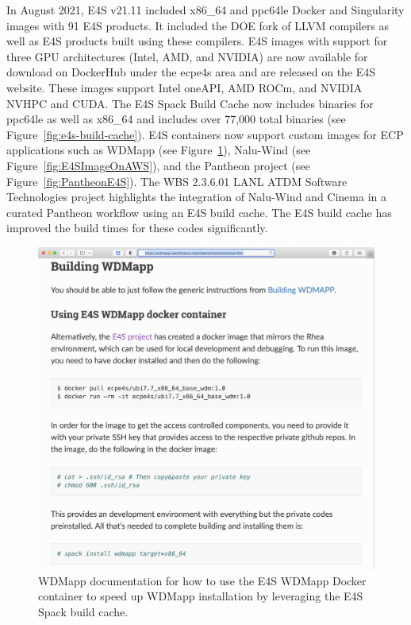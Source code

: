 In August 2021, E4S v21.11 included x86\_64 and ppc64le Docker and Singularity images with 91 E4S products. It included the DOE fork of LLVM compilers as well as E4S products built using these compilers. E4S images with support for three GPU architectures (Intel, AMD, and NVIDIA) are now available for download on DockerHub under the ecpe4s area and are released on the E4S website. These images support Intel oneAPI, AMD ROCm, and NVIDIA NVHPC and CUDA. The E4S Spack Build Cache now includes binaries for ppc64le as well as x86\_64 and includes over 77,000 total binaries (see Figure~\ref{fig:e4s-build-cache}). E4S containers now support custom images for ECP applications such as WDMapp (see Figure~\ref{fig:SpackBuildCacheWDMapp}), Nalu-Wind (see Figure~\ref{fig:E4SImageOnAWS}), and the Pantheon project (see Figure~\ref{fig:PantheonE4S}). The WBS 2.3.6.01 LANL ATDM Software Technologies project highlights the integration of Nalu-Wind and Cinema in a curated Pantheon workflow using an E4S build cache. The E4S build cache has improved the build times for these codes significantly. 
\begin{figure}
        \centering
        \includegraphics[width=0.82\linewidth]{projects/2.3.5-Ecosystem/2.3.5.01-Ecosystem-SDK/E4S_WDMApp}
        \caption{WDMapp documentation for how to use the E4S WDMapp Docker container to speed up WDMapp installation by leveraging the E4S Spack build cache.}
        \label{fig:SpackBuildCacheWDMapp}
\end{figure}


